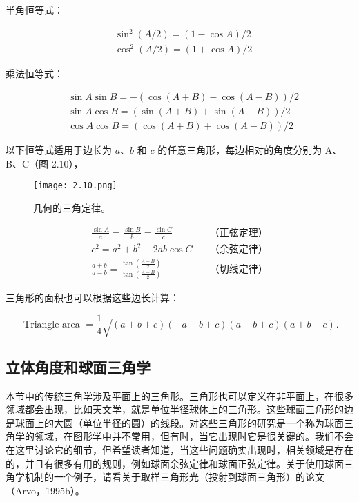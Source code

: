 \documentclass[lang=cn,10pt]{elegantbook}
\begin{document}
半角恒等式：

$$
\begin{aligned}
&\sin ^{2}(A / 2)=(1-\cos A) / 2 \\
&\cos ^{2}(A / 2)=(1+\cos A) / 2
\end{aligned}
$$

乘法恒等式：

$$
\begin{aligned}
&\sin A \sin B=-(\cos (A+B)-\cos (A-B)) / 2 \\
&\sin A \cos B=(\sin (A+B)+\sin (A-B)) / 2 \\
&\cos A \cos B=(\cos (A+B)+\cos (A-B)) / 2
\end{aligned}
$$

以下恒等式适用于边长为 $a$、$b$ 和 $c$ 的任意三角形，每边相对的角度分别为 A、B、C（图 2.10），

\begin{figure}[htbp]
\centering
\texttt{[image: 2.10.png]}
\caption{几何的三角定律。}
\end{figure}

$$
\begin{aligned}
\frac{\sin A}{a}=\frac{\sin B}{b}=\frac{\sin C}{c}\quad &\mbox{（正弦定理）}\\
c^{2}=a^{2}+b^{2}-2 a b \cos C\quad &\mbox{（余弦定律）}\\
\frac{a+b}{a-b}=\frac{\tan \left(\frac{A+B}{2}\right)}{\tan \left(\frac{A-B}{2}\right)}\quad &\mbox{（切线定律）}
\end{aligned}
$$

三角形的面积也可以根据这些边长计算：

$$
\text { Triangle area }=\frac{1}{4} \sqrt{(a+b+c)(-a+b+c)(a-b+c)(a+b-c)} .
$$

\subsection{立体角度和球面三角学}

本节中的传统三角学涉及平面上的三角形。三角形也可以定义在非平面上，在很多领域都会出现，比如天文学，就是单位半径球体上的三角形。这些球面三角形的边是球面上的大圆（单位半径的圆）的线段。对这些三角形的研究是一个称为球面三角学的领域，在图形学中并不常用，但有时，当它出现时它是很关键的。我们不会在这里讨论它的细节，但希望读者知道，当这些问题确实出现时，相关领域是存在的，并且有很多有用的规则，例如球面余弦定律和球面正弦定律。关于使用球面三角学机制的一个例子，请看关于取样三角形光（投射到球面三角形）的论文（Arvo，1995b）。
\end{document}
